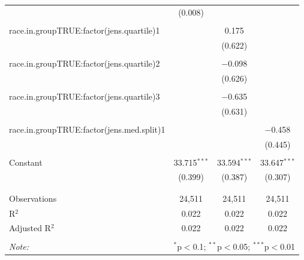 \begin{table}[!htbp]
\begin{tabular}{@{\extracolsep{5pt}}lccc}
  & (0.008) &  &  \\ 
  & & & \\ 
 race.in.groupTRUE:factor(jens.quartile)1 &  & 0.175 &  \\ 
  &  & (0.622) &  \\ 
  & & & \\ 
 race.in.groupTRUE:factor(jens.quartile)2 &  & $-$0.098 &  \\ 
  &  & (0.626) &  \\ 
  & & & \\ 
 race.in.groupTRUE:factor(jens.quartile)3 &  & $-$0.635 &  \\ 
  &  & (0.631) &  \\ 
  & & & \\ 
 race.in.groupTRUE:factor(jens.med.split)1 &  &  & $-$0.458 \\ 
  &  &  & (0.445) \\ 
  & & & \\ 
 Constant & 33.715$^{***}$ & 33.594$^{***}$ & 33.647$^{***}$ \\ 
  & (0.399) & (0.387) & (0.307) \\ 
  & & & \\ 
\hline \\[-1.8ex] 
Observations & 24,511 & 24,511 & 24,511 \\ 
R$^{2}$ & 0.022 & 0.022 & 0.022 \\ 
Adjusted R$^{2}$ & 0.022 & 0.022 & 0.022 \\ 
\hline 
\hline \\[-1.8ex] 
\textit{Note:}  & \multicolumn{3}{r}{$^{*}$p$<$0.1; $^{**}$p$<$0.05; $^{***}$p$<$0.01} \\ 
\end{tabular} 
\end{table} 
